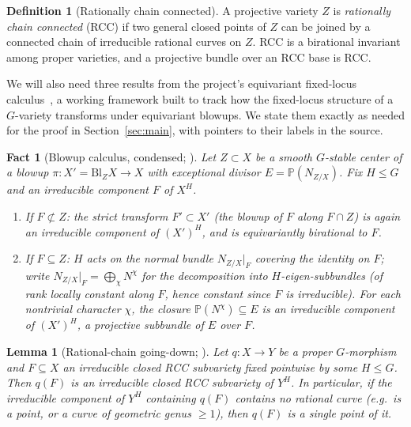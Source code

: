 \documentclass[11pt]{article}
\theoremstyle{plain}
\newtheorem{lemma}[theorem]{Lemma}
\newtheorem{fact}[theorem]{Fact}
\theoremstyle{definition}
\newtheorem{definition}[theorem]{Definition}
\theoremstyle{remark}
\newcommand{\PP}{\mathbb P}
\begin{document}
\begin{definition}[Rationally chain connected]
A projective variety $Z$ is \emph{rationally chain connected} (RCC) if
two general closed points of $Z$ can be joined by a connected chain of
irreducible rational curves on $Z$. RCC is a birational invariant among
proper varieties, and a projective bundle over an RCC base is RCC.
\end{definition}

We will also need three results from the project's equivariant
fixed-locus calculus~\cite{BComplex}, a working framework built to
track how the fixed-locus structure of a $G$-variety transforms under
equivariant blowups. We state them exactly as needed for the proof in
Section~\ref{sec:main}, with pointers to their labels in the source.

\begin{fact}[Blowup calculus, condensed; {\cite[Thm.\ 2.1]{BComplex}}]
\label{fact:blowup}
Let $Z\subset X$ be a smooth $G$-stable center of a blowup
$\pi:X'=\mathrm{Bl}_ZX\to X$ with exceptional divisor
$E=\PP(N_{Z/X})$. Fix $H\le G$ and an irreducible component $F$ of
$X^H$.
\begin{enumerate}[label=(\roman*)]
\item If $F\not\subset Z$: the strict transform $F'\subset X'$ (the
blowup of $F$ along $F\cap Z$) is again an irreducible component of
$(X')^H$, and is equivariantly birational to $F$.
\item If $F\subseteq Z$: $H$ acts on the normal bundle
$N_{Z/X}|_F$ covering the identity on $F$; write $N_{Z/X}|_F =
\bigoplus_\chi N^\chi$ for the decomposition into $H$-eigen-subbundles
(of rank locally constant along $F$, hence constant since $F$ is
irreducible). For each nontrivial character $\chi$, the closure
$\PP(N^\chi)\subseteq E$ is an irreducible component of $(X')^H$, a
projective subbundle of $E$ over $F$.
\end{enumerate}
\end{fact}

\begin{lemma}[Rational-chain going-down; {\cite[Lem.\ 4.2]{BComplex}}]
\label{lem:goingdown}
Let $q:X\to Y$ be a proper $G$-morphism and $F\subseteq X$ an
irreducible closed RCC subvariety fixed pointwise by some $H\le G$.
Then $q(F)$ is an irreducible closed RCC subvariety of $Y^H$. In
particular, if the irreducible component of $Y^H$ containing $q(F)$
contains no rational curve (e.g.\ is a point, or a curve of geometric
genus $\ge 1$), then $q(F)$ is a single point of it.
\end{lemma}
\end{document}
